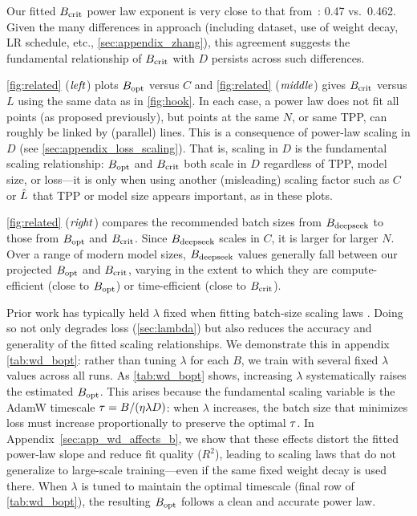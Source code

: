 Our fitted $B_{\text{crit}}$ power law exponent is very close to that
from~\citet{zhang2024how}: 0.47 vs.\ 0.462.  Given the many
differences in approach (including dataset, use of weight decay, LR
schedule, etc., \cref{sec:appendix_zhang}), this agreement suggests
the fundamental relationship of $B_{\text{crit}}$ with $D$ persists across such
differences.

\cref{fig:related} ($\text{\emph{left}}$) plots $B_{\text{opt}}$ versus $C$ and
\cref{fig:related} ($\text{\emph{middle}}$) gives $B_{\text{crit}}$ versus $L$ using
the same data as in \cref{fig:hook}.
%
In each case, a power law does not fit all points (as proposed
previously), but points at the same $N$, or same TPP, can roughly be
linked by (parallel) lines.  This is a consequence of power-law
scaling in $D$ (see \cref{sec:appendix_loss_scaling}).
%
That is, scaling in $D$ is the fundamental scaling relationship:
$B_{\text{opt}}$ and $B_{\text{crit}}$ both scale in $D$ regardless of TPP, model size,
or loss---it is only when using another (misleading) scaling factor
such as $C$ or $\hat{L}$ that TPP or model size appears important, as in
these plots.

\cref{fig:related} ($\text{\emph{right}}$) compares the recommended batch sizes
from $B_{\text{deepseek}}$ to those from $B_{\text{opt}}$ and $B_{\text{crit}}$.  Since
$B_{\text{deepseek}}$ scales in $C$, it is larger for larger $N$.  Over a range
of modern model sizes, $B_{\text{deepseek}}$ values generally fall between our
projected $B_{\text{opt}}$ and $B_{\text{crit}}$, varying in the extent to which they
are compute-efficient (close to $B_{\text{opt}}$) or time-efficient (close to
$B_{\text{crit}}$).

\label{finding:wd_bopt}

Prior work has typically held $\lambda$ fixed when fitting batch-size
scaling laws \citep{bi2024deepseek,porian2024resolving,zhang2024how}.
Doing so not only degrades loss (\cref{sec:lambda}) but also reduces
the accuracy and generality of the fitted scaling relationships.  We
demonstrate this in appendix \cref{tab:wd_bopt}: rather than tuning
$\lambda$ for each $B$, we train with several fixed $\lambda$ values
across all runs.
%
As \cref{tab:wd_bopt} shows, increasing $\lambda$ systematically
raises the estimated $B_{\text{opt}}$.  This arises because the fundamental
scaling variable is the AdamW timescale $\tau = B /
(\eta \lambda D)$: when $\lambda$ increases, the batch size that
minimizes loss must increase proportionally to preserve the optimal
$\tau$.
%
In Appendix~\ref{sec:app_wd_affects_b}, we show that these effects
distort the fitted power-law slope and reduce fit quality ($R^{2}$),
leading to scaling laws that do not generalize to large-scale
training---even if the same fixed weight decay is used there.  When
$\lambda$ is tuned to maintain the optimal timescale (final row
of \cref{tab:wd_bopt}), the resulting $B_{\text{opt}}$ follows a clean and
accurate power law.

